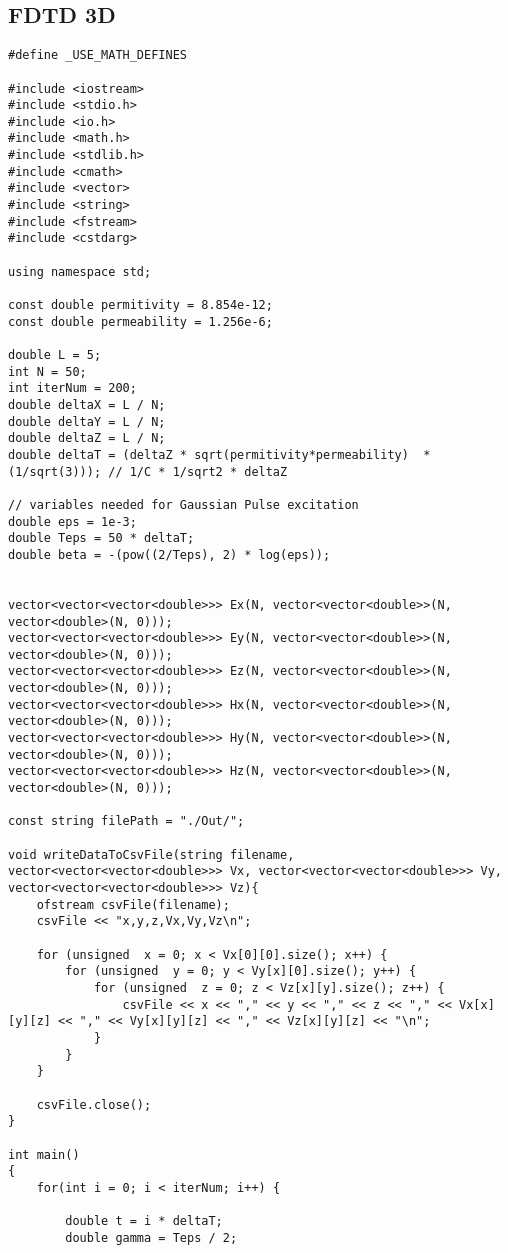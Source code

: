 \subsection{FDTD 3D}
\begin{verbatim}
#define _USE_MATH_DEFINES

#include <iostream>
#include <stdio.h>
#include <io.h>
#include <math.h>
#include <stdlib.h>
#include <cmath>
#include <vector>
#include <string>
#include <fstream>
#include <cstdarg>

using namespace std;

const double permitivity = 8.854e-12;
const double permeability = 1.256e-6;

double L = 5;
int N = 50;
int iterNum = 200;
double deltaX = L / N;
double deltaY = L / N;
double deltaZ = L / N;
double deltaT = (deltaZ * sqrt(permitivity*permeability)  * (1/sqrt(3))); // 1/C * 1/sqrt2 * deltaZ

// variables needed for Gaussian Pulse excitation
double eps = 1e-3;
double Teps = 50 * deltaT;
double beta = -(pow((2/Teps), 2) * log(eps));


vector<vector<vector<double>>> Ex(N, vector<vector<double>>(N, vector<double>(N, 0)));
vector<vector<vector<double>>> Ey(N, vector<vector<double>>(N, vector<double>(N, 0)));
vector<vector<vector<double>>> Ez(N, vector<vector<double>>(N, vector<double>(N, 0)));
vector<vector<vector<double>>> Hx(N, vector<vector<double>>(N, vector<double>(N, 0)));
vector<vector<vector<double>>> Hy(N, vector<vector<double>>(N, vector<double>(N, 0)));
vector<vector<vector<double>>> Hz(N, vector<vector<double>>(N, vector<double>(N, 0)));

const string filePath = "./Out/";

void writeDataToCsvFile(string filename, vector<vector<vector<double>>> Vx, vector<vector<vector<double>>> Vy, vector<vector<vector<double>>> Vz){
	ofstream csvFile(filename);
	csvFile << "x,y,z,Vx,Vy,Vz\n";
	
	for (unsigned  x = 0; x < Vx[0][0].size(); x++) {
		for (unsigned  y = 0; y < Vy[x][0].size(); y++) {
			for (unsigned  z = 0; z < Vz[x][y].size(); z++) {
				csvFile << x << "," << y << "," << z << "," << Vx[x][y][z] << "," << Vy[x][y][z] << "," << Vz[x][y][z] << "\n";
			}
		}
	}
	
	csvFile.close();
}

int main()
{
	for(int i = 0; i < iterNum; i++) {
		
		double t = i * deltaT;
		double gamma = Teps / 2;
		

\end{verbatim}
